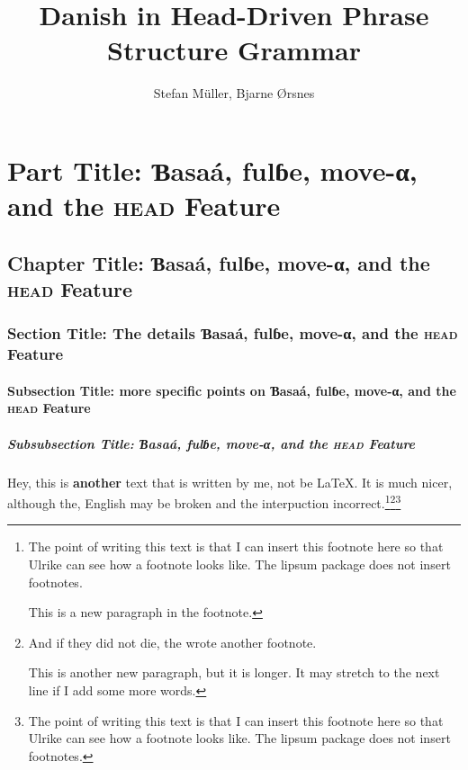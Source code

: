 \documentclass[ number=45
			   ,series=eotms
			   ,output=printondemand %
			  ]{langsci}
\title{Danish in \newlineCover Head-Driven \newlineCover Phrase Structure \newlineCover  Grammar  }
\author{Stefan Müller, \newlineCover Bjarne Ørsnes}
\begin{document}
               
         
                                       
                                
\maketitle                

\tableofcontents      
        
\part{Part Title: Ɓasaá, fulɓe, move-α, and the \textsc{head} Feature}	               
\chapter{Chapter Title: Ɓasaá, fulɓe, move-α, and the \textsc{head} Feature}
\section{Section Title: The details Ɓasaá, fulɓe, move-α, and the \textsc{head} Feature}
\subsection{Subsection Title: more specific points on Ɓasaá, fulɓe, move-α, and the \textsc{head} Feature}
\subsubsection{Subsubsection Title: Ɓasaá, fulɓe, move-α, and the \textsc{head} Feature}       
                                                     
  
Hey, this is \textbf{another} text that is written by me, not be \LaTeX{}. It is much nicer, although the,
English may be broken and the interpuction incorrect.\footnote{%
  The point of writing this text is that I can insert this footnote here so that Ulrike can see how
  a footnote looks like. The lipsum package does not insert footnotes.
 
  This is a new paragraph in the footnote.
}\footnote{%
  And if they did not die, the wrote another footnote.

  This is another new paragraph, but it is longer. It may stretch to the next line if I add some
  more words.
}\footnote{%
  The point of writing this text is that I can insert this footnote here so that Ulrike can see how
  a footnote looks like. The lipsum package does not insert footnotes.
}
\end{document}

